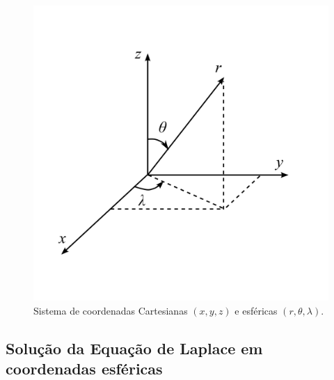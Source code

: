 \documentclass[10pt,a4paper,fleqn]{article}
\begin{document}
\begin{figure}[h]
    \centering
    \includegraphics[scale=1]{Figs/Fig2.png}
    \caption{Sistema de coordenadas Cartesianas $(x,y,z)$ e esf\'{e}ricas $(r,\theta,\lambda)$.}
    \label{fig:fig2}
\end{figure}

\subsection{Solu\c{c}\~{a}o da Equa\c{c}\~{a}o de Laplace em coordenadas esf\'{e}ricas}
\end{document}
